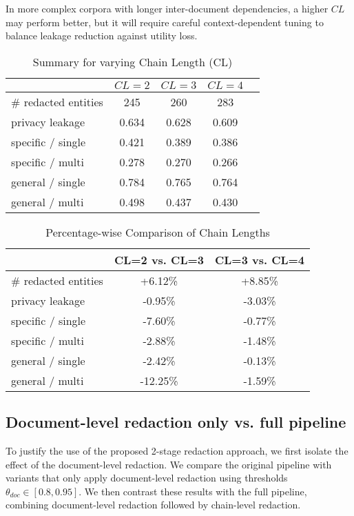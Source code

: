 In more complex corpora with longer inter-document dependencies, a higher $CL$ may perform better, but it will require careful context-dependent tuning to balance leakage reduction against utility loss.


\begin{table}[h!]
\centering
\caption{Summary for varying Chain Length (CL)}
\label{discussion-tab:chain_length}
\begin{tabular}{l c c c c}
\toprule
\textbf{ } & $CL = 2$ & $CL = 3$ & $CL = 4$ \\
\midrule
\# redacted entities & 245 & 260 & 283 \\
\midrule
privacy leakage & 0.634 &0.628 &0.609  \\
\midrule
specific / single & 0.421 & 0.389 & 0.386 \\
specific / multi & 0.278 & 0.270 & 0.266 \\
general / single & 0.784 & 0.765 & 0.764 \\
general / multi & 0.498 & 0.437 & 0.430 \\
\bottomrule
\end{tabular}
\end{table}

\begin{table}[h!]
\centering
\caption{Percentage-wise Comparison of Chain Lengths}
\label{discussion-tab:chain_length_percentage}
\begin{tabular}{l c c}
\toprule
\textbf{ } & CL=2 vs. CL=3& CL=3 vs. CL=4 \\
\midrule
\# redacted entities & +6.12\% & +8.85\% \\
\midrule

privacy leakage & -0.95\% & -3.03\% \\
\midrule
specific / single & -7.60\% & -0.77\% \\
specific / multi & -2.88\% & -1.48\% \\
general / single & -2.42\% & -0.13\% \\
general / multi & -12.25\% & -1.59\% \\
\bottomrule
\end{tabular}
\end{table}


\subsection{Document-level redaction only vs. full pipeline}
To justify the use of the proposed 2-stage redaction approach, we first isolate the effect of the document-level redaction. We compare the original pipeline with variants that only apply document-level redaction using thresholds $\theta_{doc}\in[0.8, 0.95]$. We then contrast these results with the full pipeline, combining document-level redaction followed by chain-level redaction. 

